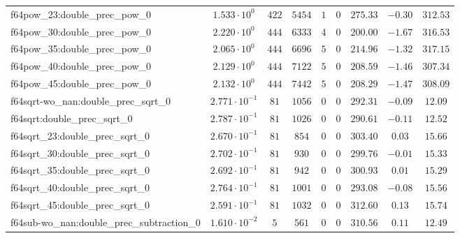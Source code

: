 \begin{tabular}{|l|c|c|c|c|c|c|c|c|}
f64pow\_23:double\_prec\_pow\_0                & $ 1.533 \cdot 10^{0}  $ & $ 422    $ & $ 5454   $ & $ 1   $ & $ 0   $ & $ 275.33      $ & $ -0.30   $ & $ 312.53  $ \\
f64pow\_30:double\_prec\_pow\_0                & $ 2.220 \cdot 10^{0}  $ & $ 444    $ & $ 6333   $ & $ 4   $ & $ 0   $ & $ 200.00      $ & $ -1.67   $ & $ 316.53  $ \\
f64pow\_35:double\_prec\_pow\_0                & $ 2.065 \cdot 10^{0}  $ & $ 444    $ & $ 6696   $ & $ 5   $ & $ 0   $ & $ 214.96      $ & $ -1.32   $ & $ 317.15  $ \\
f64pow\_40:double\_prec\_pow\_0                & $ 2.129 \cdot 10^{0}  $ & $ 444    $ & $ 7122   $ & $ 5   $ & $ 0   $ & $ 208.59      $ & $ -1.46   $ & $ 307.34  $ \\
f64pow\_45:double\_prec\_pow\_0                & $ 2.132 \cdot 10^{0}  $ & $ 444    $ & $ 7442   $ & $ 5   $ & $ 0   $ & $ 208.29      $ & $ -1.47   $ & $ 308.09  $ \\
f64sqrt-wo\_nan:double\_prec\_sqrt\_0          & $ 2.771 \cdot 10^{-1} $ & $ 81     $ & $ 1056   $ & $ 0   $ & $ 0   $ & $ 292.31      $ & $ -0.09   $ & $ 12.09   $ \\
f64sqrt:double\_prec\_sqrt\_0                  & $ 2.787 \cdot 10^{-1} $ & $ 81     $ & $ 1026   $ & $ 0   $ & $ 0   $ & $ 290.61      $ & $ -0.11   $ & $ 12.52   $ \\
f64sqrt\_23:double\_prec\_sqrt\_0              & $ 2.670 \cdot 10^{-1} $ & $ 81     $ & $ 854    $ & $ 0   $ & $ 0   $ & $ 303.40      $ & $ 0.03    $ & $ 15.66   $ \\
f64sqrt\_30:double\_prec\_sqrt\_0              & $ 2.702 \cdot 10^{-1} $ & $ 81     $ & $ 930    $ & $ 0   $ & $ 0   $ & $ 299.76      $ & $ -0.01   $ & $ 15.33   $ \\
f64sqrt\_35:double\_prec\_sqrt\_0              & $ 2.692 \cdot 10^{-1} $ & $ 81     $ & $ 942    $ & $ 0   $ & $ 0   $ & $ 300.93      $ & $ 0.01    $ & $ 15.29   $ \\
f64sqrt\_40:double\_prec\_sqrt\_0              & $ 2.764 \cdot 10^{-1} $ & $ 81     $ & $ 1001   $ & $ 0   $ & $ 0   $ & $ 293.08      $ & $ -0.08   $ & $ 15.56   $ \\
f64sqrt\_45:double\_prec\_sqrt\_0              & $ 2.591 \cdot 10^{-1} $ & $ 81     $ & $ 1032   $ & $ 0   $ & $ 0   $ & $ 312.60      $ & $ 0.13    $ & $ 15.74   $ \\
f64sub-wo\_nan:double\_prec\_subtraction\_0    & $ 1.610 \cdot 10^{-2} $ & $ 5      $ & $ 561    $ & $ 0   $ & $ 0   $ & $ 310.56      $ & $ 0.11    $ & $ 12.49   $ \\

\end{tabular}
